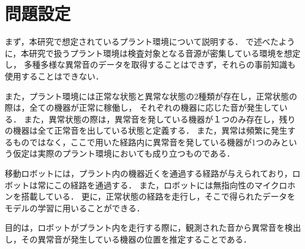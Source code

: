 \documentclass[../main]{subfiles}
\begin{document}
\section{問題設定}
\label{sec:problem_setting}
まず，本研究で想定されているプラント環境について説明する．
で述べたように，本研究で扱うプラント環境は検査対象となる音源が密集している環境を想定し，
多種多様な異常音のデータを取得することはできず，それらの事前知識も使用することはできない．

また，プラント環境には正常な状態と異常な状態の2種類が存在し，正常状態の際は，全ての機器が正常に稼働し，
それぞれの機器に応じた音が発生している．
また，異常状態の際は，異常音を発している機器が１つのみ存在し，残りの機器は全て正常音を出している状態と定義する．
また，異常は頻繁に発生するものではなく，ここで用いた経路内に異常音を発している機器が1つのみという仮定は実際のプラント環境においても成り立つものである．

移動ロボットには，プラント内の機器近くを通過する経路が与えられており，ロボットは常にこの経路を通過する．
また，ロボットには無指向性のマイクロホンを搭載している．
更に，正常状態の経路を走行し，そこで得られたデータをモデルの学習に用いることができる．

目的は，ロボットがプラント内を走行する際に，観測された音から異常音を検出し，その異常音が発生している機器の位置を推定することである．
\end{document}
